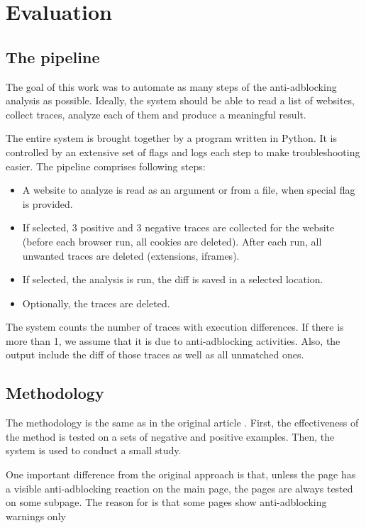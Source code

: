\chapter{Evaluation}
\label{evaluation}

\section{The pipeline}

The goal of this work was to automate as many steps of the anti-adblocking analysis as possible.
Ideally, the system should be able to read a list of websites, collect traces, analyze
each of them and produce a meaningful result.

The entire system is brought together by a program written in Python.
It is controlled by an extensive set of flags and logs each step to make troubleshooting easier.
The pipeline comprises following steps:
\begin{itemize}
  \item A website to analyze is read as an argument or from a file, when special flag is provided.
  \item If selected, 3 positive and 3 negative traces are collected for the website (before each browser run,
           all cookies are deleted). After each run, all unwanted traces are deleted (extensions, iframes).
  \item If selected, the analysis is run, the diff is saved in a selected location.
  \item Optionally, the traces are deleted.
\end{itemize}

The system counts the number of traces with execution differences.
If there is more than 1, we assume that it is due to anti-adblocking activities.
Also, the output include the diff of those traces as well as all unmatched ones.

\section{Methodology}
\label{methodology}

The methodology is the same as in the original article \cite{DBLP:conf/ndss/ZhuHQSY18}.
First, the effectiveness of the method is tested on a sets of negative and positive examples.
Then, the system is used to conduct a small study.


One important difference from the original approach is that, unless the page has a visible anti-adblocking
reaction on the main page, the pages are always tested on some subpage. The reason for is that
some pages show anti-adblocking warnings only 

